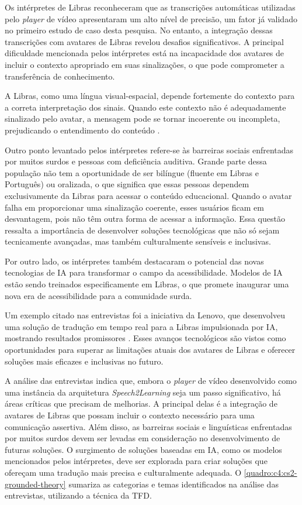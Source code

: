 Os intérpretes de Libras reconheceram que as transcrições automáticas utilizadas pelo \textit{player} de vídeo apresentaram um alto nível de precisão, um fator já validado no primeiro estudo de caso desta pesquisa. No entanto, a integração dessas transcrições com avatares de Libras revelou desafios significativos. A principal dificuldade mencionada pelos intérpretes está na incapacidade dos avatares de incluir o contexto apropriado em suas sinalizações, o que pode comprometer a transferência de conhecimento. 

A Libras, como uma língua visual-espacial, depende fortemente do contexto para a correta interpretação dos sinais. Quando este contexto não é adequadamente sinalizado pelo avatar, a mensagem pode se tornar incoerente ou incompleta, prejudicando o entendimento do conteúdo \cite{Quadros2017, Quadros2019, Honora2021}.

Outro ponto levantado pelos intérpretes refere-se às barreiras sociais enfrentadas por muitos surdos e pessoas com deficiência auditiva. Grande parte dessa população não tem a oportunidade de ser bilíngue (fluente em Libras e Português) ou oralizada, o que significa que essas pessoas dependem exclusivamente da Libras para acessar o conteúdo educacional. Quando o avatar falha em proporcionar uma sinalização coerente, esses usuários ficam em desvantagem, pois não têm outra forma de acessar a informação. Essa questão ressalta a importância de desenvolver soluções tecnológicas que não só sejam tecnicamente avançadas, mas também culturalmente sensíveis e inclusivas.

Por outro lado, os intérpretes também destacaram o potencial das novas tecnologias de IA para transformar o campo da acessibilidade. Modelos de IA estão sendo treinados especificamente em Libras, o que promete inaugurar uma nova era de acessibilidade para a comunidade surda. 

Um exemplo citado nas entrevistas foi a iniciativa da Lenovo, que desenvolveu uma solução de tradução em tempo real para a Libras impulsionada por IA, mostrando resultados promissores \cite{Lenovo2023}. Esses avanços tecnológicos são vistos como oportunidades para superar as limitações atuais dos avatares de Libras e oferecer soluções mais eficazes e inclusivas no futuro.

A análise das entrevistas indica que, embora o \textit{player} de vídeo desenvolvido como uma instância da arquitetura \textit{Speech2Learning} seja um passo significativo, há áreas críticas que precisam de melhorias. A principal delas é a integração de avatares de Libras que possam incluir o contexto necessário para uma comunicação assertiva. Além disso, as barreiras sociais e linguísticas enfrentadas por muitos surdos devem ser levadas em consideração no desenvolvimento de futuras soluções. O surgimento de soluções baseadas em IA, como os modelos mencionados pelos intérpretes, deve ser explorada para criar soluções que ofereçam uma tradução mais precisa e culturalmente adequada. O \autoref{quadro:c4:cs2-grounded-theory} sumariza as categorias e temas identificados na análise das entrevistas, utilizando a técnica da TFD.

